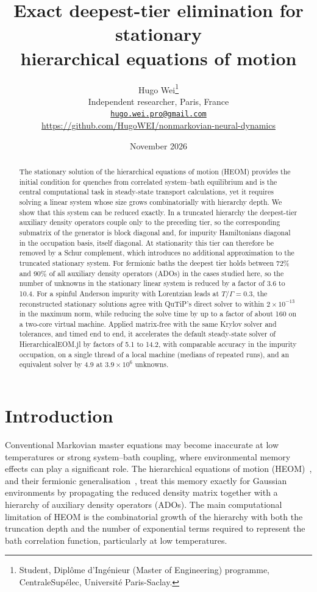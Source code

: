 \documentclass[11pt,a4paper]{article}
\title{\bfseries Exact deepest-tier elimination for stationary\\
hierarchical equations of motion}
\author{Hugo Wei\thanks{Student, Diplôme d'Ingénieur (Master of Engineering) programme, CentraleSupélec, Université Paris-Saclay.}\\[3pt]
\small Independent researcher, Paris, France\\
\small \href{mailto:hugo.wei.pro@gmail.com}{\texttt{hugo.wei.pro@gmail.com}}\\
\small \url{https://github.com/HugoWEI/nonmarkovian-neural-dynamics}}
\date{November 2026}
\begin{document}
\maketitle

\begin{abstract}
\noindent
The stationary solution of the hierarchical equations of motion (HEOM)
provides the initial condition for quenches from correlated system--bath
equilibrium and is the central computational task in steady-state transport
calculations, yet it requires solving a linear system whose size grows combinatorially with hierarchy depth. We show that
this system can be reduced exactly. In a truncated hierarchy the deepest-tier auxiliary density operators
couple only to the preceding tier, so the corresponding submatrix of the generator is block diagonal and,
for impurity Hamiltonians diagonal in the occupation basis, itself diagonal. At stationarity this tier
can therefore be removed by a Schur complement, which introduces no additional
approximation to the truncated stationary system. For
fermionic baths the deepest tier holds between 72\% and 90\% of all auxiliary
density operators (ADOs) in the cases studied here, so the number of unknowns
in the stationary linear system is reduced by a factor of 3.6 to 10.4. For a spinful Anderson impurity with Lorentzian leads at
$T/\Gamma = 0.3$, the reconstructed stationary solutions agree with QuTiP's
direct solver to within $2\times10^{-13}$ in the maximum norm, while reducing
the solve time by up to a factor of about 160 on a two-core virtual machine. Applied matrix-free with the same Krylov solver and tolerances, and timed end to
end, it accelerates the default steady-state solver of HierarchicalEOM.jl by
factors of 5.1 to 14.2, with comparable accuracy in the impurity occupation, on a
single thread of a local machine (medians of
repeated runs), and an equivalent solver by 4.9 at $3.9\times10^{6}$ unknowns.
\end{abstract}

\section{Introduction}

Conventional Markovian master equations may become inaccurate at low
temperatures or strong system--bath coupling, where environmental memory
effects can play a significant role. The hierarchical equations of motion (HEOM)~\cite{TanimuraKubo1989,Tanimura2020},
and their fermionic generalisation~\cite{Jin2008}, treat this memory exactly for
Gaussian environments by propagating the reduced density matrix together with a
hierarchy of auxiliary density operators (ADOs). The main computational limitation
of HEOM is the combinatorial growth of the hierarchy with both the truncation
depth and the number of exponential terms required to represent the bath
correlation function, particularly at low temperatures.
\end{document}

